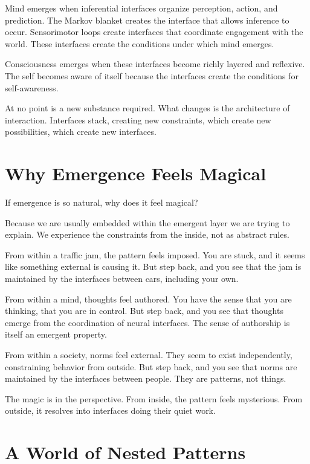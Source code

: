 \documentclass[
  openright]{book}
\begin{document}
Mind emerges when inferential interfaces organize perception, action,
and prediction. The Markov blanket creates the interface that allows
inference to occur. Sensorimotor loops create interfaces that coordinate
engagement with the world. These interfaces create the conditions under
which mind emerges.

Consciousness emerges when these interfaces become richly layered and
reflexive. The self becomes aware of itself because the interfaces
create the conditions for self-awareness.

At no point is a new substance required. What changes is the
architecture of interaction. Interfaces stack, creating new constraints,
which create new possibilities, which create new interfaces.

\section{Why Emergence Feels Magical}\label{why-emergence-feels-magical}

If emergence is so natural, why does it feel magical?

Because we are usually embedded within the emergent layer we are trying
to explain. We experience the constraints from the inside, not as
abstract rules.

From within a traffic jam, the pattern feels imposed. You are stuck, and
it seems like something external is causing it. But step back, and you
see that the jam is maintained by the interfaces between cars, including
your own.

From within a mind, thoughts feel authored. You have the sense that you
are thinking, that you are in control. But step back, and you see that
thoughts emerge from the coordination of neural interfaces. The sense of
authorship is itself an emergent property.

From within a society, norms feel external. They seem to exist
independently, constraining behavior from outside. But step back, and
you see that norms are maintained by the interfaces between people. They
are patterns, not things.

The magic is in the perspective. From inside, the pattern feels
mysterious. From outside, it resolves into interfaces doing their quiet
work.

\section{A World of Nested Patterns}\label{a-world-of-nested-patterns}
\end{document}
